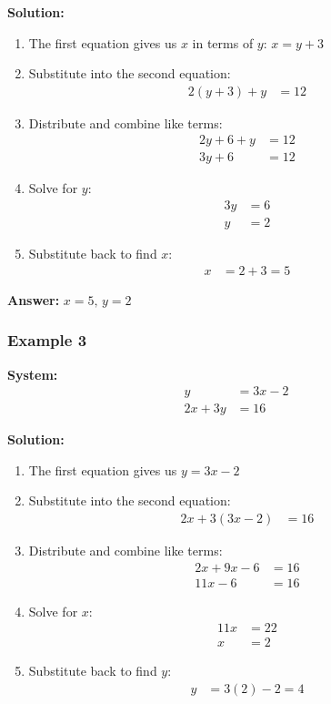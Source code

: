 \documentclass{article}
\begin{document}
\textbf{Solution:}

\begin{enumerate}
    \item The first equation gives us $x$ in terms of $y$: $x = y + 3$
    \item Substitute into the second equation:
    \begin{align*}
        2(y + 3) + y &= 12
    \end{align*}
    \item Distribute and combine like terms:
    \begin{align*}
        2y + 6 + y &= 12 \\
        3y + 6 &= 12
    \end{align*}
    \item Solve for $y$:
    \begin{align*}
        3y &= 6 \\
        y &= 2
    \end{align*}
    \item Substitute back to find $x$:
    \begin{align*}
        x &= 2 + 3 = 5
    \end{align*}
\end{enumerate}

\textbf{Answer:} $x = 5, \, y = 2$ \,  

\subsubsection{Example 3}

\textbf{System:}
\begin{align*}
y &= 3x - 2 \\
2x + 3y &= 16
\end{align*}

\textbf{Solution:}

\begin{enumerate}
    \item The first equation gives us $y = 3x - 2$
    \item Substitute into the second equation:
    \begin{align*}
        2x + 3(3x - 2) &= 16
    \end{align*}
    \item Distribute and combine like terms:
    \begin{align*}
        2x + 9x - 6 &= 16 \\
        11x - 6 &= 16
    \end{align*}
    \item Solve for $x$:
    \begin{align*}
        11x &= 22 \\
        x &= 2
    \end{align*}
    \item Substitute back to find $y$:
    \begin{align*}
        y &= 3(2) - 2 = 4
    \end{align*}
\end{enumerate}
\end{document}
